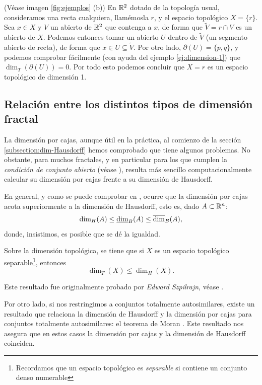 \begin{ejemplo}
(Véase imagen \ref{fig:ejemplos} (b))
En $\mathbb{R}^2$ dotado de la topología usual, consideramos una recta cualquiera, llamémosla $r$, y el espacio topológico $X=\{r\}$. Sea $x\in X$ y $V$ un abierto de $\mathbb{R}^2$ que contenga a $x$, de forma que $\tilde{V} = r\cap V$ es un abierto de $X$. Podemos entonces tomar un abierto $U$ dentro de $\tilde{V}$ (un segmento abierto de recta), de forma que $x\in U\subseteq \tilde{V}$. Por otro lado, $\partial(U)=\{p,q\}$, y podemos comprobar fácilmente (con ayuda del ejemplo \ref{ej:dimension-1}) que $\dim_T(\partial(U))=0$. Por todo esto podemos concluir que $X=r$ es un espacio topológico de dimensión 1. 
\end{ejemplo}

\subsection{Relación entre los distintos tipos de dimensión fractal}

La dimensión por cajas, aunque útil en la práctica, al comienzo de la sección \ref{subsection:dim-Hausdorff} hemos comprobado que tiene algunos problemas. No obstante, para muchos fractales, y en particular para los que cumplen la \textit{condición de conjunto abierto} (véase \cite{Wagon}), resulta más sencillo computacionalmente calcular su dimensión por cajas frente a su dimensión de Hausdorff.

En general, y como se puede comprobar en \cite[Sección 3.1]{alma991007022459704990}, ocurre que la dimensión por cajas acota superiormente a la dimensión de Hausdorff, esto es, dado $A\subset\mathbb{R}^n$:
$$
\dim_H(A)\leq\underline{\dim}_B (A) \leq \overline{\dim}_B (A),
$$
donde, insistimos, es posible que se dé la igualdad.

Sobre la dimensión topológica, se tiene que si $X$ es un espacio topológico separable\footnote{Recordamos que un espacio topológico es \textit{separable} si contiene un conjunto denso numerable}, entonces
$$
\dim_T(X)\leq\dim_H(X).
$$

Este resultado fue originalmente probado por \textit{Edward Szpilrajn}, véase \cite[Capítulo VII]{Hurewicz-Wallman}.

Por otro lado, si nos restringimos a conjuntos totalmente autosimilares, existe un resultado que relaciona la dimensión de Hausdorff y la dimensión por cajas para conjuntos totalmente autosimilares: el teorema de Moran \cite{Moran}. Este resultado nos asegura que en estos casos la dimensión por cajas y la dimensión de Hausdorff coinciden.

